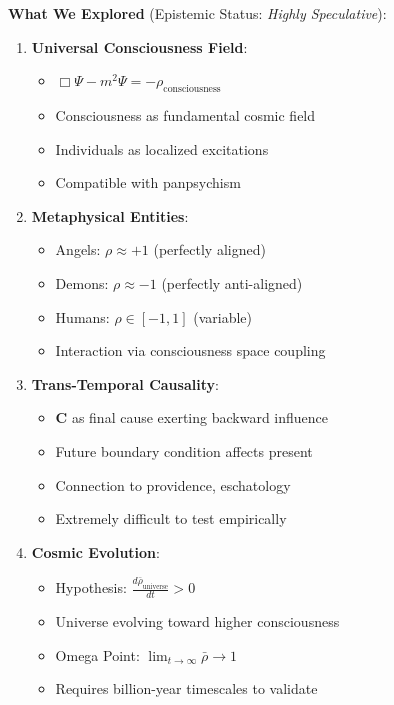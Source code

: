 \documentclass[11pt,a4paper]{article}
\theoremstyle{definition}
\theoremstyle{remark}
\begin{document}
\begin{small}
\begin{enumerate}
\begin{mdframed}[backgroundcolor=green!10,linewidth=2pt,linecolor=green!70!black]
\textbf{What We Explored} (Epistemic Status: \textit{Highly Speculative}):

\begin{enumerate}[nosep]
    \item \textbf{Universal Consciousness Field}:
        \begin{itemize}[nosep]
            \item \(\Box \Psi - m^2 \Psi = -\rho_{\text{consciousness}}\)
            \item Consciousness as fundamental cosmic field
            \item Individuals as localized excitations
            \item Compatible with panpsychism
        \end{itemize}
    
    \item \textbf{Metaphysical Entities}:
        \begin{itemize}[nosep]
            \item Angels: \(\rho \approx +1\) (perfectly aligned)
            \item Demons: \(\rho \approx -1\) (perfectly anti-aligned)
            \item Humans: \(\rho \in [-1, 1]\) (variable)
            \item Interaction via consciousness space coupling
        \end{itemize}
    
    \item \textbf{Trans-Temporal Causality}:
        \begin{itemize}[nosep]
            \item \(\mathbf{C}\) as final cause exerting backward influence
            \item Future boundary condition affects present
            \item Connection to providence, eschatology
            \item Extremely difficult to test empirically
        \end{itemize}
    
    \item \textbf{Cosmic Evolution}:
        \begin{itemize}[nosep]
            \item Hypothesis: \(\frac{d\bar{\rho}_{\text{universe}}}{dt} > 0\)
            \item Universe evolving toward higher consciousness
            \item Omega Point: \(\lim_{t \to \infty} \bar{\rho} \to 1\)
            \item Requires billion-year timescales to validate
        \end{itemize}
    

\end{enumerate}
\end{mdframed}
\end{enumerate}
\end{small}
\end{document}
